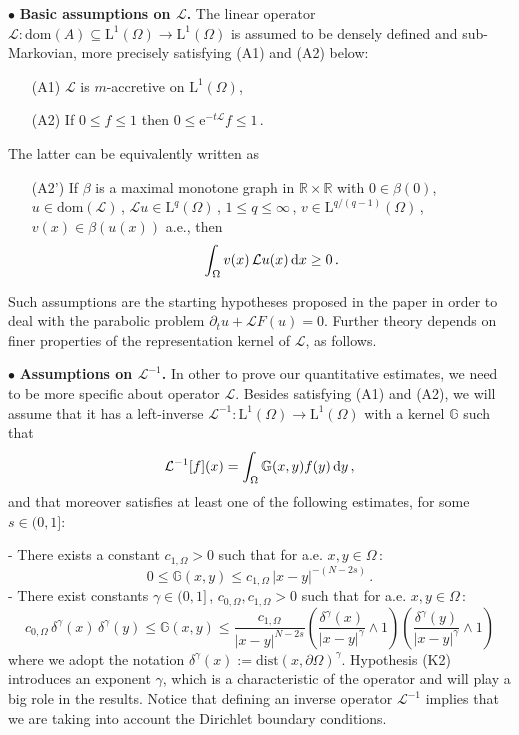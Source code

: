 \documentclass[11pt]{article}
\numberwithin{equation}{section}
\newcommand{\dx}{\,{\rm d}x}
\newcommand{\dy}{\,{\rm d}y}
\def\LL{\mathrm{L}} %
\newcommand{\A}{\mathcal{L}}
\newcommand{\AI}{\mathcal{L}^{-1}}
\newcommand{\p}{{\delta^\gamma}} %
\newcommand{\K}{{\mathbb G}}
\newcommand{\RR}{\mathbb{R}}
\def\ee{\mathrm{e}} %
\def\dist{\mathrm{dist}} %
\def\dom{\mathrm{dom}} %
\begin{document}
\noindent $\bullet$ {\bf Basic assumptions on $\A$.} The linear operator $\A: \dom(A)\subseteq\LL^1(\Omega)\to\LL^1(\Omega)$ is assumed to be densely defined  and sub-Markovian, more precisely satisfying (A1) and (A2) below:
\begin{enumerate}%
\item[(A1)] $\A$ is $m$-accretive on $\LL^1(\Omega)$,
\item[(A2)] If $0\le f\le 1$ then $0\le \ee^{-t\A}f\le 1$\,.
\end{enumerate}
The latter can be equivalently written as
\begin{enumerate}
\item[(A2')] If $\beta$ is a maximal monotone graph in $\RR\times\RR$ with $0\in \beta(0)$, $u\in \dom(\A)$\,, $\A u\in \LL^q(\Omega)$\,, $1\le q\le\infty$\,, $v\in \LL^{q/(q-1)}(\Omega)$\,, $v(x)\in \beta(u(x))$ a.e., then
    \[
    \int_\Omega v(x)\,\A u(x)\dx\ge 0\,.
    \]
\end{enumerate}
Such assumptions are the starting   hypotheses   proposed in the paper \cite{BV-PPR2-1} in order to deal with the parabolic problem $\partial_t u+\A F(u)=0$.
Further theory depends on finer properties of the representation kernel of  $\A$, as follows.

\noindent $\bullet$ {\bf Assumptions on $\AI$.} In other to prove our quantitative estimates, we need to be more specific about operator $\A$. Besides satisfying (A1) and (A2), we will assume that it has a left-inverse $\AI: \LL^1(\Omega)\to \LL^1(\Omega)$  with a kernel $\K$ such that
\[
\AI[f](x)=\int_\Omega \K(x,y)f(y)\dy\,,
\]
and that moreover satisfies at least one of the following estimates, for some $s\in (0,1]$:

\noindent - There exists a constant $c_{1,\Omega}>0$ such that for a.e. $x,y\in \Omega$\,:
\[\tag{K1}
0\le \K(x,y)\le c_{1,\Omega}\,|x-y|^{-(N-2s)}\,.
\]
- There exist constants $\gamma\in (0,1]$\,, $c_{0,\Omega},c_{1,\Omega}>0$ such that for a.e. $x,y\in \Omega$\,:
\[\tag{K2}
c_{0,\Omega}\,\p(x)\,\p(y) \le \K(x,y)\le \frac{c_{1,\Omega}}{|x-y|^{N-2s}}
\left(\frac{\p(x)}{|x-y|^\gamma}\wedge 1\right)
\left(\frac{\p(y)}{|x-y|^\gamma}\wedge 1\right)
\]
where we adopt the notation $\p(x):=\dist(x, \partial\Omega)^\gamma$.
Hypothesis (K2) introduces an exponent $\gamma$, which is a  characteristic of the operator and will play a big role in the results.
Notice that defining an inverse operator $\AI$ implies that we are taking into account the Dirichlet boundary conditions.
\end{document}
